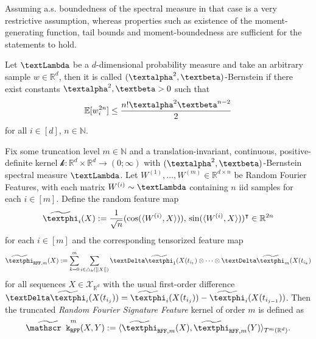 \documentclass[openany]{book}
\begin{document}
Assuming a.s. boundedness of the spectral measure in that case is a very restrictive assumption, whereas properties such as existence of the moment-generating function, tail bounds and moment-boundedness are sufficient for the statements to hold.
\begin{definition}
    Let $\gLambda$ be a $d$-dimensional probability measure and take an arbitrary sample $w\in \mathbb R^d$, then it is called $(\galpha^2, \gbeta)$-Bernstein if there exist constants $\galpha^2, \gbeta>0$ such that
    \begin{equation*}
        \mathbb E[w_i^{2n}]\leq \frac{n!\galpha^2 \gbeta^{n-2}}{2}
    \end{equation*}
    for all $i\in [d]$, $n\in \mathbb N$.
\end{definition}
\begin{definition}
    Fix some truncation level $m\in \mathbb N$ and a translation-invariant, continuous, positive-definite kernel $\mathscr k:\mathbb R^d\times \mathbb R^d\to (0;\infty)$ with $(\galpha^2, \gbeta)$-Bernstein spectral measure $\gLambda$. Let $W^{(1)}, \dots,W^{(m)}\in \mathbb R^{d\times n}$ be Random Fourier Features, with each matrix $W^{(i)}\sim \gLambda$ containing $n$ iid samples for each $i\in [m]$. Define the random feature map
    \begin{equation}\label{rfsf-feature-map}
        \widetilde{\gphi}_i(X):=\frac{1}{\sqrt{n}}(\cos(\langle W^{(i)}, X\rangle )), \,\sin(\langle W^{(i)}, X\rangle ))^\intercal\in \mathbb R^{2n}
    \end{equation}
    for each $i\in [m]$ and the corresponding tensorized feature map
    \begin{equation*}
        \widetilde{\gphi}_{\mathtt{RFF}, m}(X):=\sum_{k=0}^m\sum_{i\in \triangle_k([\vert X\vert ])} \gDelta \widetilde{\gphi}_1(X(t_{i_1})\otimes \cdots \otimes \gDelta\widetilde{\gphi}_m(X(t_{i_k})
    \end{equation*}
    for all sequences $X\in \mathscr X_{\mathbb R^d}$ with the usual first-order difference $\gDelta\widetilde{\gphi}_i(X(t_{i_j}))=\widetilde{\gphi}_i(X(t_{i_j}))-\widetilde{\gphi}_i(X(t_{i_{j-1}}))$. Then the truncated \textit{Random Fourier Signature Feature} kernel of order $m$ is defined as
    \begin{equation*}
        \widetilde{\mathscr k}^m_{\mathtt{RFF}}(X,Y):=\langle  \widetilde{\gphi}_{\mathtt{RFF}, m}(X), \widetilde{\gphi}_{\mathtt{RFF}, m}(Y)\rangle_{T^{m}(\mathbb R^d)}.
    \end{equation*}
\end{definition}
\end{document}
